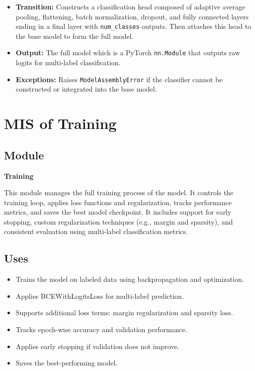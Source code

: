 \documentclass[12pt, titlepage]{article}
\begin{document}
\begin{itemize}
    \item \textbf{Transition:} Constructs a classification head composed of adaptive average pooling, flattening, batch normalization, dropout, and fully connected layers ending in a final layer with \texttt{num\_classes} outputs. Then attaches this head to the base model to form the full model.
    \item \textbf{Output:} The full model which is a PyTorch \texttt{nn.Module} that outputs raw logits for multi-label classification.
    \item \textbf{Exceptions:} Raises \texttt{ModelAssemblyError} if the classifier cannot be constructed or integrated into the base model.
\end{itemize}


\section{MIS of Training}
\label{sec:Training}

\subsection{Module}
\label{sec:TrainingModule}

\textbf{Training}

This module manages the full training process of the model. It controls the training loop, applies loss functions and regularization, tracks performance metrics, and saves the best model checkpoint. It includes support for early stopping, custom regularization techniques (e.g., margin and sparsity), and consistent evaluation using multi-label classification metrics.

\subsection{Uses}
\label{sec:TrainingUses}

\begin{itemize}
    \item Trains the model on labeled data using backpropagation and optimization.
    \item Applies BCEWithLogitsLoss for multi-label prediction.
    \item Supports additional loss terms: margin regularization and sparsity loss.
    \item Tracks epoch-wise accuracy and validation performance.
    \item Applies early stopping if validation does not improve.
    \item Saves the best-performing model.
\end{itemize}
\end{document}
